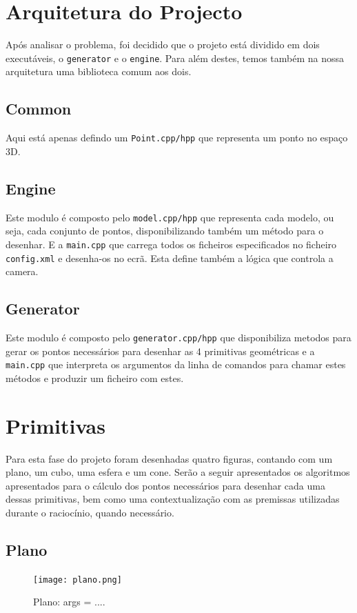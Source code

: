 \documentclass[a4paper]{article}
\begin{document}
\section{Arquitetura do Projecto}
Após analisar o problema, foi decidido que o projeto está dividido em dois executáveis, o \texttt{generator} e o \texttt{engine}. Para além destes, temos também na nossa arquitetura uma biblioteca comum aos dois.

\subsection{Common}

Aqui está apenas defindo um \texttt{Point.cpp/hpp} que representa um ponto no espaço 3D.

\subsection{Engine}

Este modulo é composto pelo \texttt{model.cpp/hpp} que representa cada modelo, ou seja, cada conjunto de pontos, disponibilizando também um método para o desenhar. E a \texttt{main.cpp} que carrega todos os ficheiros especificados no ficheiro \texttt{config.xml} e desenha-os no ecrã. Esta define também a lógica que controla a camera.

\subsection{Generator}

Este modulo é composto pelo \texttt{generator.cpp/hpp} que disponibiliza metodos para gerar os pontos necessários para desenhar as 4 primitivas geométricas e a \texttt{main.cpp} que interpreta os argumentos da linha de comandos para chamar estes métodos e produzir um ficheiro com estes.

\section{Primitivas}
 Para esta fase do projeto foram desenhadas quatro figuras, contando com um plano, um cubo, uma esfera e um cone. Serão a seguir apresentados os algoritmos apresentados para o cálculo dos pontos necessários para desenhar cada uma dessas primitivas, bem como uma contextualização com as premissas utilizadas durante o raciocínio, quando necessário.
\subsection{Plano}
\begin{figure}[H]
\centering
\texttt{[image: plano.png]}
\caption{Plano: args = ....}
\end{figure}
\end{document}
